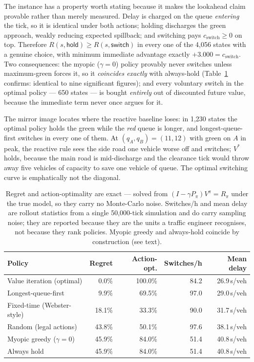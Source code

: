 \documentclass[11pt]{article}
\newcommand{\hold}{\textsf{hold}}
\newcommand{\swi}{\textsf{switch}}
\begin{document}
The instance has a property worth stating because it makes the lookahead claim provable rather than
merely measured. Delay is charged on the queue \emph{entering} the tick, so it is identical under
both actions; holding discharges the green approach, weakly reducing expected spillback; and
switching pays $c_{\text{switch}} \geq 0$ on top. Therefore
$R(s,\hold) \geq R(s,\swi)$ in every one of the 4,056 states with a genuine choice, with
minimum immediate advantage exactly $+3.000 = c_{\text{switch}}$. Two consequences: the myopic
($\gamma = 0$) policy provably never switches unless maximum-green forces it, so it \emph{coincides
exactly} with always-hold (Table~\ref{tab:rl-baselines} confirms: identical to nine significant
figures); and every voluntary switch in the optimal policy --- 650 states --- is bought
\emph{entirely} out of discounted future value, because the immediate term never once argues for it.

The mirror image locates where the reactive baseline loses: in 1,230 states the optimal policy
holds the green while the \emph{red} queue is longer, and longest-queue-first switches in every one
of them. At $(q_A,q_B) = (11,12)$ with green on $A$ in peak, the reactive rule sees the side road
one vehicle worse off and switches; $V^{*}$ holds, because the main road is mid-discharge and the
clearance tick would throw away five vehicles of capacity to save one vehicle of queue. The optimal
switching curve is emphatically not the diagonal.

\begin{table}[t]
\centering
\small
\caption{Regret and action-optimality are exact --- solved from
$(I - \gamma P_\pi)V^\pi = R_\pi$ under the true model, so they carry no Monte-Carlo noise.
Switches/h and mean delay are rollout statistics from a single 50,000-tick simulation and do carry
sampling noise; they are reported because they are the units a traffic engineer recognises, not
because they rank policies. Myopic greedy and always-hold coincide by construction (see text).}
\label{tab:rl-baselines}
\begin{tabular}{@{}lrrrr@{}}
\toprule
\textbf{Policy} & \textbf{Regret} & \textbf{Action-opt.} & \textbf{Switches/h} & \textbf{Mean delay} \\
\midrule
Value iteration (optimal)      & 0.0\%  & 100.0\% & 84.2 & 26.9\,s/veh \\
Longest-queue-first            & 9.9\%  & 69.5\%  & 97.0 & 29.0\,s/veh \\
Fixed-time (Webster-style)     & 18.1\% & 33.3\%  & 90.0 & 31.7\,s/veh \\
Random (legal actions)         & 43.8\% & 50.1\%  & 97.6 & 38.1\,s/veh \\
Myopic greedy ($\gamma = 0$)   & 45.9\% & 84.0\%  & 51.4 & 40.8\,s/veh \\
Always hold                    & 45.9\% & 84.0\%  & 51.4 & 40.8\,s/veh \\
\bottomrule
\end{tabular}
\end{table}
\end{document}
